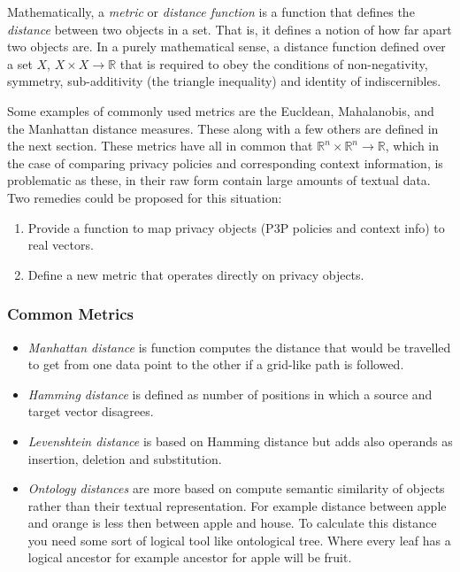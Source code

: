 Mathematically, a \emph{metric} or \emph{distance function} is a function that defines the \emph{distance} between two objects in a set. That is, it defines a notion of how far apart two objects are. In a purely mathematical sense, a distance function defined over a set $X$, $X\times X\longrightarrow \mathbb{R}$ that is required to obey the conditions of non-negativity, symmetry, sub-additivity (the triangle inequality) and identity of indiscernibles. 

Some examples of commonly used metrics are the Eucldean, Mahalanobis, and the Manhattan distance measures. These along with a few others are defined in the next section. These metrics have all in common that $\mathbb{R}^n\times \mathbb{R}^n\longrightarrow \mathbb{R}$, which in the case of comparing privacy policies and corresponding context information, is problematic as these, in their raw form contain large amounts of textual data. Two remedies could be proposed for this situation:

\begin{enumerate}
\item Provide a function to map privacy objects (P3P policies and context info) to real vectors.
\item Define a new metric that operates directly on privacy objects.
\end{enumerate}


\subsubsection{Common Metrics}

\begin{itemize}
\item \emph{Manhattan distance} is function computes the distance that would be travelled to get from one data point to the other if a grid-like path is followed. 
\item \emph{Hamming distance} is defined as number of positions in which a source and target vector disagrees.
\item \emph{Levenshtein distance} is based on Hamming distance but adds also operands as insertion, deletion and substitution. 
\item \emph{Ontology distances} are more based on compute semantic similarity of objects rather than their textual representation. For example distance between apple and orange is less then between apple and house. To calculate this distance you need some sort of logical tool like ontological tree. Where every leaf has a logical ancestor for example ancestor for apple will be fruit.
\end{itemize}
